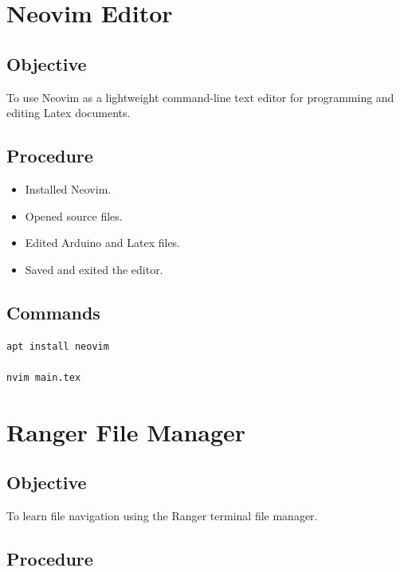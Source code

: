 \documentclass[12pt,a4paper]{report}
\begin{document}

\section{Neovim Editor}

\subsection{Objective}

To use Neovim as a lightweight command-line text editor for programming and editing Latex documents.

\subsection{Procedure}

\begin{itemize}
\item Installed Neovim.
\item Opened source files.
\item Edited Arduino and Latex files.
\item Saved and exited the editor.
\end{itemize}

\subsection{Commands}

\begin{lstlisting}[language=bash]
apt install neovim

nvim main.tex
\end{lstlisting}


\section{Ranger File Manager}

\subsection{Objective}

To learn file navigation using the Ranger terminal file manager.

\subsection{Procedure}
\end{document}
